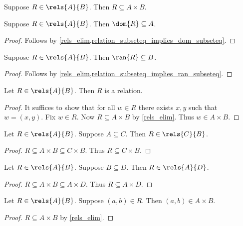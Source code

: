 \begin{proposition}\label{rels_elim}
    Suppose $R\in\rels{A}{B}$.
    Then $R\subseteq A\times B$.
\end{proposition}

\begin{proposition}\label{rels_dom_subseteq}
    Suppose $R\in\rels{A}{B}$.
    Then $\dom{R}\subseteq A$.
\end{proposition}
\begin{proof}
    Follows by \cref{rels_elim,relation_subseteq_implies_dom_subseteq}.
\end{proof}

\begin{proposition}\label{rels_ran_subseteq}
    Suppose $R\in\rels{A}{B}$.
    Then $\ran{R}\subseteq B$.
\end{proposition}
\begin{proof}
    Follows by \cref{rels_elim,relation_subseteq_implies_ran_subseteq}.
\end{proof}

\begin{proposition}\label{rels_is_relation}
    Let $R\in\rels{A}{B}$.
    Then $R$ is a relation.
\end{proposition}
\begin{proof}
    It suffices to show that for all $w\in R$ there exists $x, y$ such that $w = (x, y)$.
    Fix $w\in R$.
    Now $R\subseteq A\times B$ by \cref{rels_elim}.
    Thus $w\in A\times B$.
\end{proof}

\begin{proposition}\label{rels_weaken_dom}
    Let $R\in\rels{A}{B}$.
    Suppose $A\subseteq C$.
    Then $R\in\rels{C}{B}$.
\end{proposition}
\begin{proof}
    $R\subseteq A\times B\subseteq C\times B$.
    Thus $R\subseteq C\times B$.
\end{proof}

\begin{proposition}\label{rels_weaken_codom}
    Let $R\in\rels{A}{B}$.
    Suppose $B\subseteq D$.
    Then $R\in\rels{A}{D}$.
\end{proposition}
\begin{proof}
    $R\subseteq A\times B\subseteq A\times D$.
    Thus $R\subseteq A\times D$.
\end{proof}

\begin{proposition}\label{rels_type}
    Let $R\in\rels{A}{B}$.
    Suppose $(a,b)\in R$.
    Then $(a,b)\in A\times B$.
\end{proposition}
\begin{proof}
    $R\subseteq A\times B$ by \cref{rels_elim}.
\end{proof}

